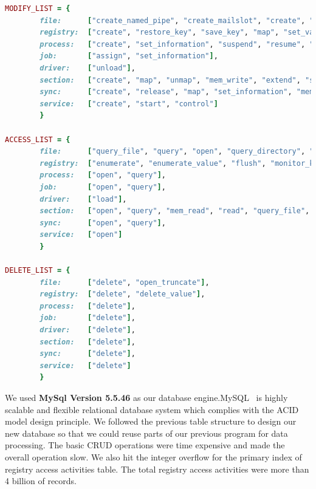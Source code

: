 \begin{lstlisting}[language=ruby,caption={Mapping of generalize system calls with regard to behavioral profile },label={lbl:ntapi}]
MODIFY_LIST = {
        file:      ["create_named_pipe", "create_mailslot", "create", "rename", "lock", "set_information", "write", "unlock", "flush_buffer", "suspend", "map", "resume"],
        registry:  ["create", "restore_key", "save_key", "map", "set_value", "set_information", "compress_key", "lock", "resume", "suspend", "mem_write"],
        process:   ["create", "set_information", "suspend", "resume", "unmap", "map"],
        job:       ["assign", "set_information"],
        driver:    ["unload"],
        section:   ["create", "map", "unmap", "mem_write", "extend", "suspend", "resume", "set_information", "release"],
        sync:      ["create", "release", "map", "set_information", "mem_write"],
        service:   ["create", "start", "control"]
        }

ACCESS_LIST = {
        file:      ["query_file", "query", "open", "query_directory", "query_information", "read", "monitor_dir", "control", "device_control", "fs_control", "query_value"],
        registry:  ["enumerate", "enumerate_value", "flush", "monitor_key", "open", "query", "query_value", "mem_read"],
        process:   ["open", "query"],
        job:       ["open", "query"],
        driver:    ["load"],
        section:   ["open", "query", "mem_read", "read", "query_file", "query_system"],
        sync:      ["open", "query"],
        service:   ["open"]
        }

DELETE_LIST = {
        file:      ["delete", "open_truncate"],
        registry:  ["delete", "delete_value"],
        process:   ["delete"],
        job:       ["delete"],
        driver:    ["delete"],
        section:   ["delete"],
        sync:      ["delete"],
        service:   ["delete"]
        }

\end{lstlisting}
We used \textbf{MySql Version 5.5.46} as our database engine.MySQL~\cite[]{mysql} is highly scalable and flexible relational database system which complies with the ACID model design principle.
We followed the previous table structure to design our new database so that we could reuse parts of our previous program for data processing.
The basic CRUD operations were time expensive and made the overall operation slow.
We also hit the integer overflow for the primary index of registry access activities table.
The total registry access activities were more than 4 billion of records.
